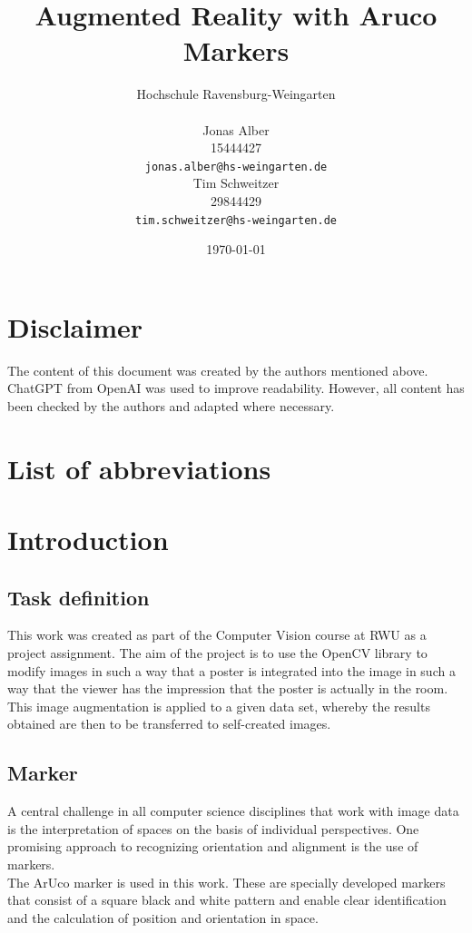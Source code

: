 \documentclass[a4paper,twocolumn]{article}
\title{Augmented Reality with Aruco Markers}
\author{
    Hochschule Ravensburg-Weingarten \\[1em] %
    \begin{minipage}[t]{0.45\textwidth} %
        \centering
        Jonas Alber \\ %
        15444427\\
        \texttt{jonas.alber@hs-weingarten.de} %
    \end{minipage}
    \hfill
    \begin{minipage}[t]{0.45\textwidth} %
        \centering
        Tim Schweitzer \\  29844429 \\ %
        \texttt{tim.schweitzer@hs-weingarten.de} %
    \end{minipage}
}
\date{\today}
\begin{document}
\maketitle

\section*{Disclaimer}

The content of this document was created by the authors mentioned above. ChatGPT from OpenAI was used to improve readability. However, all content has been checked by the authors and adapted where necessary.


\section*{List of abbreviations}
\begin{acronym}[RWU]
\end{acronym}

\section{Introduction}

\subsection{Task definition}
This work was created as part of the Computer Vision course at \ac{RWU} as a project assignment. The aim of the project is to use the OpenCV library to modify images in such a way that a poster is integrated into the image in such a way that the viewer has the impression that the poster is actually in the room.
\\
This image augmentation is applied to a given data set, whereby the results obtained are then to be transferred to self-created images.
\subsection{Marker}
A central challenge in all computer science disciplines that work with image data is the interpretation of spaces on the basis of individual perspectives. One promising approach to recognizing orientation and alignment is the use of markers.
\\
The ArUco marker is used in this work. These are specially developed markers that consist of a square black and white pattern and enable clear identification and the calculation of position and orientation in space. \cite{aruco1}
\end{document}
